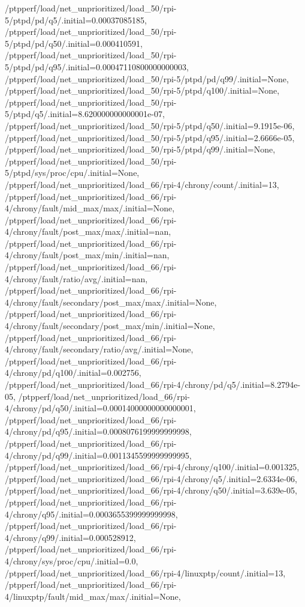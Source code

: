 {    /ptpperf/load/net_unprioritized/load_50/rpi-5/ptpd/pd/q5/.initial=0.00037085185,
    /ptpperf/load/net_unprioritized/load_50/rpi-5/ptpd/pd/q50/.initial=0.000410591,
    /ptpperf/load/net_unprioritized/load_50/rpi-5/ptpd/pd/q95/.initial=0.00047110800000000003,
    /ptpperf/load/net_unprioritized/load_50/rpi-5/ptpd/pd/q99/.initial=None,
    /ptpperf/load/net_unprioritized/load_50/rpi-5/ptpd/q100/.initial=None,
    /ptpperf/load/net_unprioritized/load_50/rpi-5/ptpd/q5/.initial=8.620000000000001e-07,
    /ptpperf/load/net_unprioritized/load_50/rpi-5/ptpd/q50/.initial=9.1915e-06,
    /ptpperf/load/net_unprioritized/load_50/rpi-5/ptpd/q95/.initial=2.6666e-05,
    /ptpperf/load/net_unprioritized/load_50/rpi-5/ptpd/q99/.initial=None,
    /ptpperf/load/net_unprioritized/load_50/rpi-5/ptpd/sys/proc/cpu/.initial=None,
    /ptpperf/load/net_unprioritized/load_66/rpi-4/chrony/count/.initial=13,
    /ptpperf/load/net_unprioritized/load_66/rpi-4/chrony/fault/mid_max/max/.initial=None,
    /ptpperf/load/net_unprioritized/load_66/rpi-4/chrony/fault/post_max/max/.initial=nan,
    /ptpperf/load/net_unprioritized/load_66/rpi-4/chrony/fault/post_max/min/.initial=nan,
    /ptpperf/load/net_unprioritized/load_66/rpi-4/chrony/fault/ratio/avg/.initial=nan,
    /ptpperf/load/net_unprioritized/load_66/rpi-4/chrony/fault/secondary/post_max/max/.initial=None,
    /ptpperf/load/net_unprioritized/load_66/rpi-4/chrony/fault/secondary/post_max/min/.initial=None,
    /ptpperf/load/net_unprioritized/load_66/rpi-4/chrony/fault/secondary/ratio/avg/.initial=None,
    /ptpperf/load/net_unprioritized/load_66/rpi-4/chrony/pd/q100/.initial=0.002756,
    /ptpperf/load/net_unprioritized/load_66/rpi-4/chrony/pd/q5/.initial=8.2794e-05,
    /ptpperf/load/net_unprioritized/load_66/rpi-4/chrony/pd/q50/.initial=0.00014000000000000001,
    /ptpperf/load/net_unprioritized/load_66/rpi-4/chrony/pd/q95/.initial=0.0008076199999999998,
    /ptpperf/load/net_unprioritized/load_66/rpi-4/chrony/pd/q99/.initial=0.0011345599999999995,
    /ptpperf/load/net_unprioritized/load_66/rpi-4/chrony/q100/.initial=0.001325,
    /ptpperf/load/net_unprioritized/load_66/rpi-4/chrony/q5/.initial=2.6334e-06,
    /ptpperf/load/net_unprioritized/load_66/rpi-4/chrony/q50/.initial=3.639e-05,
    /ptpperf/load/net_unprioritized/load_66/rpi-4/chrony/q95/.initial=0.0003655399999999998,
    /ptpperf/load/net_unprioritized/load_66/rpi-4/chrony/q99/.initial=0.000528912,
    /ptpperf/load/net_unprioritized/load_66/rpi-4/chrony/sys/proc/cpu/.initial=0.0,
    /ptpperf/load/net_unprioritized/load_66/rpi-4/linuxptp/count/.initial=13,
    /ptpperf/load/net_unprioritized/load_66/rpi-4/linuxptp/fault/mid_max/max/.initial=None,
}
